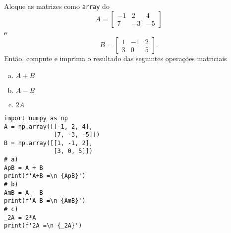 \begin{exer}
  Aloque as matrizes como \lstinline+array+ do {\numpy}
  \begin{equation}
    A =
    \begin{bmatrix}
        -1 & 2 & 4\\
        7 & -3 & -5
      \end{bmatrix}      
  \end{equation}
  e
  \begin{equation}
    B =
    \begin{bmatrix}
        1 & -1 & 2\\
        3 & 0 & 5
      \end{bmatrix}.      
  \end{equation}
  Então, compute e imprima o resultado das seguintes operações matriciais
  \begin{enumerate}[a)]
  \item $A + B$
  \item $A - B$
  \item $2A$
  \end{enumerate}
\end{exer}
\begin{resp}
\begin{lstlisting}
import numpy as np
A = np.array([[-1, 2, 4],
              [7, -3, -5]])
B = np.array([[1, -1, 2],
              [3, 0, 5]])
# a)
ApB = A + B
print(f'A+B =\n {ApB}')
# b)
AmB = A - B
print(f'A-B =\n {AmB}')
# c)
_2A = 2*A
print(f'2A =\n {_2A}')
\end{lstlisting}
\end{resp}

